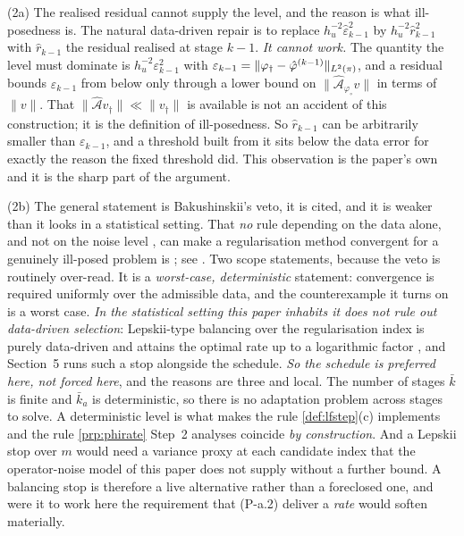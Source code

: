 (2a) The realised residual cannot supply the level, and the reason is what ill-posedness is. The
natural data-driven repair is to replace $h_u^{-2}\hat\varepsilon_{k-1}^{2}$ by
$h_u^{-2}\hat r_{k-1}^{2}$ with $\hat r_{k-1}$ the residual realised at stage $k-1$. \emph{It cannot
work.} The quantity the level must dominate is $h_u^{-2}\varepsilon_{k-1}^{2}$ with
$\varepsilon_{k-1}=\|\varphi_{\dagger}-\hat\varphi^{(k-1)}\|_{L^{2}(\pi)}$, and a residual bounds $\varepsilon_{k-1}$
from below only through a lower bound on $\|\hat{\mathcal A}_{\varphi_\circ}v\|$ in terms of $\|v\|$.
That $\|\hat{\mathcal A}v_\dagger\|\ll\|v_\dagger\|$ is available is not an accident of this
construction; it is the definition of ill-posedness. So $\hat r_{k-1}$ can be arbitrarily smaller than
$\varepsilon_{k-1}$, and a threshold built from it sits below the data error for exactly the reason the
fixed threshold did. This observation is the paper's own and it is the sharp part of the
argument.

(2b) The general statement is Bakushinskii's veto, it is cited, and it is weaker than it looks in
a statistical setting. That \emph{no} rule depending on the data alone, and not on the noise level
, can make a regularisation method convergent for a genuinely ill-posed problem is
\citet{bakushinskii1984}; see \citet[\S3.3]{engl2000}. Two scope statements, because the veto is
routinely over-read. It is a \emph{worst-case, deterministic}
statement: convergence is required uniformly over the admissible data, and the counterexample it turns
on is a worst case. \emph{In the statistical setting this paper inhabits it does not rule out
data-driven selection}: Lepskii-type balancing over the regularisation index is purely data-driven and
attains the optimal rate up to a logarithmic factor \citep{lepskii1990}, and Section~5 runs such a
stop alongside the schedule. \emph{So the schedule is preferred here, not forced here}, and the reasons are three and
local. The number of stages $\bar k$ is finite and $\bar k_a$ is deterministic, so there is no
adaptation problem across stages to solve. A deterministic level is what makes the rule
\cref{def:lfstep}(c) implements and the rule \cref{prp:phirate} Step~2 analyses coincide \emph{by
construction}. And a Lepskii stop over $m$ would
need a variance proxy at each candidate index that the operator-noise model of this paper does not
supply without a further bound. A balancing stop is therefore a live alternative rather than a
foreclosed one, and were it to work here the requirement that (P-a.2) deliver a \emph{rate} would
soften materially.


